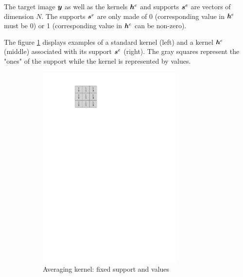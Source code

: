 The target image $\bm{y}$ as well as the kernels $\bm{h}^e$ and supports $\bm{s}^e$ are vectors of dimension $N$. The supports $\bm{s}^e$ are only made of 0 (corresponding value in $\bm{h}^e$ must be 0) or 1 (corresponding value in $\bm{h}^e$ can be non-zero).

The figure \ref{fig_example_kernel} displays examples of a standard kernel (left) and a kernel $\bm{h}^e$ (middle) associated with its support $\bm{s}^e$ (right). The gray squares represent the "ones" of the support while the kernel is represented by values.

\begin{figure}[!ht]\centering
\begin{subfigure}[b]{0.20\textwidth}\centering
\includegraphics[width=0.80\textwidth]{figures/kernel-exple.pdf}
\caption{Averaging kernel: fixed support and values}\label{fig_example_kernel}
\end{subfigure}
\begin{subfigure}[b]{0.79\textwidth}\centering

\end{subfigure}
\end{figure}
